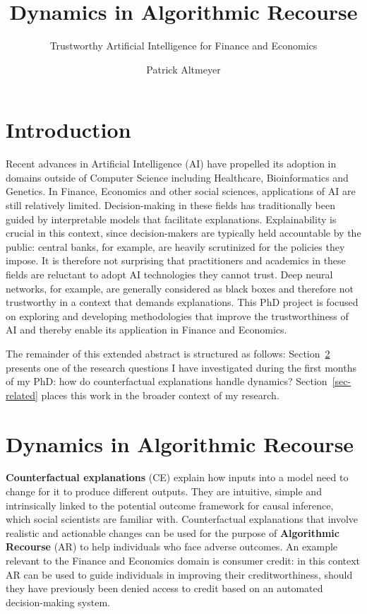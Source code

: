 \documentclass[
  sigconf]{acmart}
\author{Patrick Altmeyer}
\affiliation{%
  \institution{Delft University of Technology}
  \city{Delft}
  \country{The Netherlands}
}
\title{Dynamics in Algorithmic Recourse}
\subtitle{Trustworthy Artificial Intelligence for Finance and Economics}
\author{}
\date{}
\begin{document}
\maketitle

\ifdefined\Shaded\renewenvironment{Shaded}{\begin{tcolorbox}[sharp corners, breakable, borderline west={3pt}{0pt}{shadecolor}, interior hidden, frame hidden, enhanced, boxrule=0pt]}{\end{tcolorbox}}\fi

\hypertarget{introduction}{%
\section{Introduction}\label{introduction}}

Recent advances in Artificial Intelligence (AI) have propelled its
adoption in domains outside of Computer Science including Healthcare,
Bioinformatics and Genetics. In Finance, Economics and other social
sciences, applications of AI are still relatively limited.
Decision-making in these fields has traditionally been guided by
interpretable models that facilitate explanations. Explainability is
crucial in this context, since decision-makers are typically held
accountable by the public: central banks, for example, are heavily
scrutinized for the policies they impose. It is therefore not surprising
that practitioners and academics in these fields are reluctant to adopt
AI technologies they cannot trust. Deep neural networks, for example,
are generally considered as black boxes and therefore not trustworthy in
a context that demands explanations. This PhD project is focused on
exploring and developing methodologies that improve the trustworthiness
of AI and thereby enable its application in Finance and Economics.

The remainder of this extended abstract is structured as follows:
Section~\ref{sec-main} presents one of the research questions I have
investigated during the first months of my PhD: how do counterfactual
explanations handle dynamics? Section~\ref{sec-related} places this work
in the broader context of my research.

\hypertarget{sec-main}{%
\section{Dynamics in Algorithmic Recourse}\label{sec-main}}

\textbf{Counterfactual explanations} (CE) explain how inputs into a
model need to change for it to produce different outputs. They are
intuitive, simple and intrinsically linked to the potential outcome
framework for causal inference, which social scientists are familiar
with. Counterfactual explanations that involve realistic and actionable
changes can be used for the purpose of \textbf{Algorithmic Recourse}
(AR) to help individuals who face adverse outcomes. An example relevant
to the Finance and Economics domain is consumer credit: in this context
AR can be used to guide individuals in improving their creditworthiness,
should they have previously been denied access to credit based on an
automated decision-making system.
\end{document}
